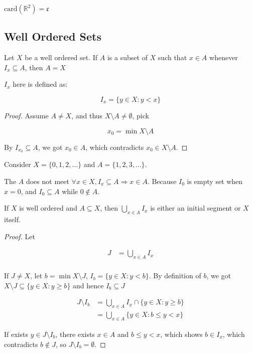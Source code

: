 \begin{corollary}
    $\mathrm{card}(\mathbb{R}^2) = \mathfrak{c}$
\end{corollary}

\subsection{Well Ordered Sets}

\begin{thm}
    Let $X$ be a well ordered set. If $A$ is a subset
    of $X$ such that $x \in A$ whenever $I_x \subseteq A$, then $A = X$

    $I_x$ here is defined as:

    \[
        I_x = \{ y \in X: y < x  \}
    \]
\end{thm}

\begin{proof}
    Assume $A \ne X$, and thus $X \setminus A \ne \emptyset$, pick 

    \[
        x_0 = \min X \setminus A
    \]

    By $I_{x_0} \subseteq A$, we got $x_0 \in A$, which contradicts $x_0 \in X \setminus A$.
\end{proof}

\begin{example}
    Consider $X = \{ 0,1,2, \dots \}$ and $A = \{ 1,2,3, \dots \}$. 

    The $A$ does not meet $\forall x \in X, I_x \subseteq A \Rightarrow x \in A$. Because $I_0$
    is empty set when $x=0$, and $I_0 \subseteq A$ while $0 \notin A$.
\end{example}

\begin{thm}
    If $X$ is well ordered and $A \subseteq X$, then $\bigcup_{x \in A} I_x$
    is either an initial segment or $X$ itself.
\end{thm}

\begin{proof}
    Let 
    
    \begin{align*}
        J &= \bigcup_{x \in A} I_x \\
    \end{align*}

    If $J \ne X$, let $b = \min X \setminus J$, $I_b = \{ y \in X:  y <  b\}$. 
    By definition of $b$, we got $X \setminus J \subseteq \{ y \in X: y \ge b\}$
    and hence $I_b \subseteq J$


        \begin{align*}
            J \setminus I_b &= \bigcup_{x \in A} I_x \cap \{ y \in X: y \ge b\} \\
            &= \bigcup_{x \in A} \{y \in X: b \le y < x\}
        \end{align*}

    If exists $y \in J \setminus I_b$, there exists $x \in A$ and $b \le y < x$, which shows $b \in I_x$, which 
    contradicts $b \notin J$, so $J \setminus I_b = \emptyset$.

\end{proof}

